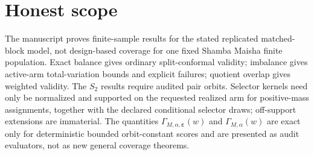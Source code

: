 \documentclass{article}
\begin{document}
\section{Honest scope}

The manuscript proves finite-sample results for the stated replicated matched-block model, not design-based coverage for one fixed Shamba Maisha finite population. Exact balance gives ordinary split-conformal validity; imbalance gives active-arm total-variation bounds and explicit failures; quotient overlap gives weighted validity. The \(S_2\) results require audited pair orbits. Selector kernels need only be normalized and supported on the requested realized arm for positive-mass assignments, together with the declared conditional selector draws; off-support extensions are immaterial. The quantities \(\Gamma_{M,\alpha,\boldsymbol\varepsilon}(w)\) and \(\Gamma_{M,\alpha}(w)\) are exact only for deterministic bounded orbit-constant scores and are presented as audit evaluators, not as new general coverage theorems.
\end{document}
